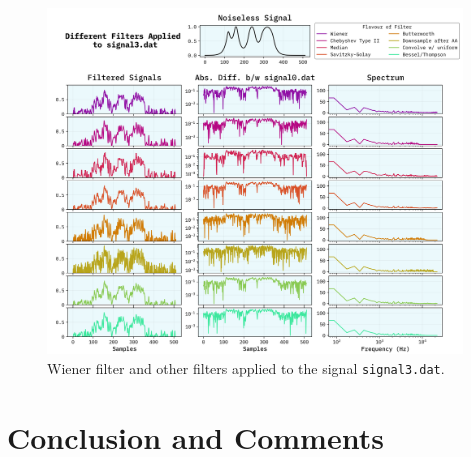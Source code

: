 \documentclass[10pt, titlepage, a4paper]{article}
\begin{document}
\begin{figure}[p]
    \centering
    \includegraphics[width=0.98\textwidth]{../WienerFilter/Images/filters-signal3.dat.png}
    \caption{Wiener filter and other filters applied to the signal \texttt{signal3.dat}.}
    \label{fig:other-filters-3}
\end{figure}






\section{Conclusion and Comments}

% 
% 

\end{document}
